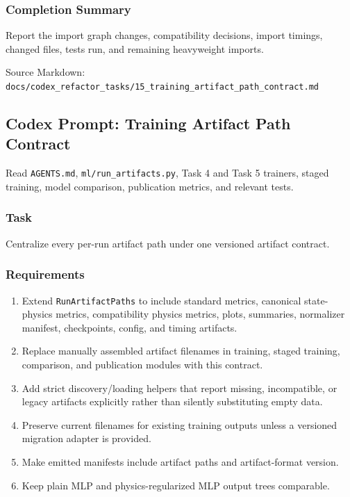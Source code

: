 \documentclass[
]{article}
\providecommand{\tightlist}{%
  \setlength{\itemsep}{0pt}\setlength{\parskip}{0pt}}
\begin{document}
\hypertarget{completion-summary-3}{%
\subsubsection{Completion Summary}\label{completion-summary-3}}

Report the import graph changes, compatibility decisions, import
timings, changed files, tests run, and remaining heavyweight imports.

Source Markdown:
\texttt{docs/codex\_refactor\_tasks/15\_training\_artifact\_path\_contract.md}

\hypertarget{codex-prompt-training-artifact-path-contract}{%
\subsection{Codex Prompt: Training Artifact Path
Contract}\label{codex-prompt-training-artifact-path-contract}}

Read \texttt{AGENTS.md}, \texttt{ml/run\_artifacts.py}, Task 4 and Task
5 trainers, staged training, model comparison, publication metrics, and
relevant tests.

\hypertarget{task-14}{%
\subsubsection{Task}\label{task-14}}

Centralize every per-run artifact path under one versioned artifact
contract.

\hypertarget{requirements-14}{%
\subsubsection{Requirements}\label{requirements-14}}

\begin{enumerate}
\def\labelenumi{\arabic{enumi}.}
\tightlist
\item
  Extend \texttt{RunArtifactPaths} to include standard metrics,
  canonical state-physics metrics, compatibility physics metrics, plots,
  summaries, normalizer manifest, checkpoints, config, and timing
  artifacts.
\item
  Replace manually assembled artifact filenames in training, staged
  training, comparison, and publication modules with this contract.
\item
  Add strict discovery/loading helpers that report missing,
  incompatible, or legacy artifacts explicitly rather than silently
  substituting empty data.
\item
  Preserve current filenames for existing training outputs unless a
  versioned migration adapter is provided.
\item
  Make emitted manifests include artifact paths and artifact-format
  version.
\item
  Keep plain MLP and physics-regularized MLP output trees comparable.
\end{enumerate}
\end{document}
